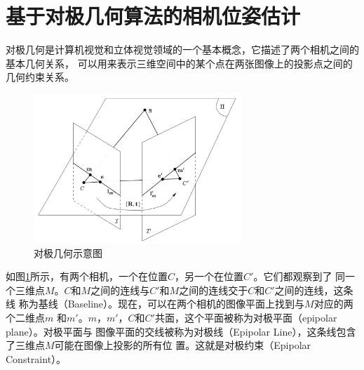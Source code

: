 \section{基于对极几何算法的相机位姿估计}

\par 对极几何是计算机视觉和立体视觉领域的一个基本概念，它描述了两个相机之间的基本几何关系，
可以用来表示三维空间中的某个点在两张图像上的投影点之间的几何约束关系。

\begin{figure}[htb]
	\centering
	\includegraphics[width=0.7\textwidth]{figures/epipolar.png}
	\caption{对极几何示意图}
	\label{fig:epipolar}
\end{figure}

\par 如图\ref{fig:epipolar}\cite{epipolar}所示，有两个相机，一个在位置$C$，另一个在位置$C'$。它们都观察到了
同一个三维点$M$。$C$和$M$之间的连线与$C'$和$M$之间的连线交于$C$和$C'$之间的连线，这条线
称为基线（Baseline）。现在，可以在两个相机的图像平面上找到与$M$对应的两个二维点$m$
和$m'$。$m$，$m'$，$C$和$C'$共面，这个平面被称为对极平面（epipolar plane）。对极平面与
图像平面的交线被称为对极线（Epipolar Line），这条线包含了三维点$M$可能在图像上投影的所有位
置。这就是对极约束（Epipolar Constraint）。

